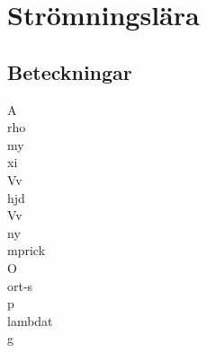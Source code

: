 \chapter{Strömningslära}
\section*{Beteckningar}
\acrfull{A} \\
\acrfull{rho} \\
\acrfull{my} \\
\acrfull{xi} \\
\acrfull{Vv}\\
\acrfull{hjd} \\
\acrfull{Vv} \\
\acrfull{ny} \\
\acrfull{mprick} \\
\acrfull{O} \\
\acrfull{ort-s}\\
\acrfull{p} \\
\acrfull{lambdat} \\
\acrfull{g}


